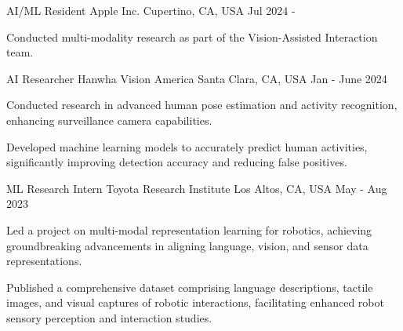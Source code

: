 


\begin{cventries}
\cventry
{AI/ML Resident} %
{Apple Inc.} %
{Cupertino, CA, USA} %
{Jul 2024 - } %
{ %
\begin{cvitems}
    \item Conducted multi-modality research as part of the Vision-Assisted Interaction team.
\end{cvitems}
}


\cventry
{AI Researcher} %
{Hanwha Vision America} %
{Santa Clara, CA, USA} %
{Jan - June 2024} %
{ %
\begin{cvitems}
    \item Conducted research in advanced human pose estimation and activity recognition, enhancing surveillance camera capabilities.
    \item Developed machine learning models to accurately predict human activities, significantly improving detection accuracy and reducing false positives.
\end{cvitems}
}


\cventry
{ML Research Intern} %
{Toyota Research Institute} %
{Los Altos, CA, USA} %
{May - Aug 2023} %
{ %
\begin{cvitems}
    \item Led a project on multi-modal representation learning for robotics, achieving groundbreaking advancements in aligning language, vision, and sensor data representations.
    \item Published a comprehensive dataset comprising language descriptions, tactile images, and visual captures of robotic interactions, facilitating enhanced robot sensory perception and interaction studies.
\end{cvitems}
}


\end{cventries}
